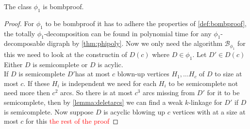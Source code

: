 \begin{thm}
    The class $\phi_1$ is bombproof.
\end{thm}
\begin{proof}
    For $\phi_1$ to be bombproof it has to adhere the properties of \autoref{def:bombproof}, the totally $\phi_1$-decomposition can be found in polynomial time for any $\phi_1$-decomposable digraph by \autoref{thm:phipoly}.
    Now we only need the algorithm $\mathcal{B}_{\phi_1}$ for this we need to look at the constructin of $D(c)$ where $D\in \phi_1$.
    Let $D'\in D(c)$ Either $D$ is semicomplete or $D$ is acylic.\\
    If $D$ is semicomplete $D'$has at most $c$ blown-up vertices $H_1,\dots H_c$ of $D$ to size at most $c$.
    If these $H_i$ is independent we need for each $H_i$ to be semicomplete not need more then $c^2$ arcs. 
    So there is at most $c^3$ arcs missing from $D'$ for it to be semicomplete, then by \autoref{lemma:deletarcs} we can find a weak $k$-linkage for $D'$ if $D$ is semicomplete.
    Now suppose $D$ is acyclic blowing up $c$ vertices with at a size at most $c$ for this \textcolor{red}{the rest of the proof}
\end{proof}

